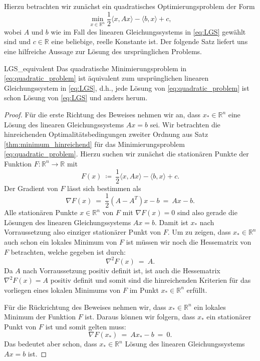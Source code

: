 Hierzu betrachten wir zunächst ein quadratisches Optimierungsproblem der Form
\begin{equation}
\label{eq:quadratic_problem}
\min_{x\in \mathbb{R}^n} \frac{1}{2} \langle x, Ax \rangle - \langle b, x \rangle + c,
\end{equation}
wobei $A$ und $b$ wie im Fall des linearen Gleichungssystems in \eqref{eq:LGS} gewählt sind und $c \in \mathbb{R}$ eine beliebige, reelle Konstante ist.
Der folgende Satz liefert uns eine hilfreiche Aussage zur Lösung des ursprünglichen Problems.
\begin{theorem}{}{LGS_equivalent}
Das quadratische Minimierungsproblem in \eqref{eq:quadratic_problem} ist äquivalent zum ursprünglichen linearen Gleichungssystem in \eqref{eq:LGS}, d.h., jede Lösung von \eqref{eq:quadratic_problem} ist schon Lösung von \eqref{eq:LGS} und anders herum.
\end{theorem}
%
%
\begin{proof}
Für die erste Richtung des Beweises nehmen wir an, dass $x_* \in \mathbb{R}^n$ eine Lösung des linearen Gleichungssystems $Ax = b$ sei. 
Wir betrachten die hinreichenden Optimalitätsbedingungen zweiter Ordnung aus Satz \ref{thm:minimum_hinreichend} für das Minimierungsproblem \eqref{eq:quadratic_problem}. 
Hierzu suchen wir zunächst die stationären Punkte der Funktion $F \colon \mathbb{R}^n \rightarrow \mathbb{R}$ mit
\begin{equation*}
F(x) \ \coloneqq \ \frac{1}{2} \langle x, Ax \rangle - \langle b, x \rangle + c.
\end{equation*}
Der Gradient von $F$ lässt sich bestimmen als
\begin{equation*}
\nabla F(x) \ = \ \frac{1}{2}(A - A^T)x - b \ = \ Ax - b.
\end{equation*}
Alle stationären Punkte $x \in \mathbb{R}^n$ von $F$ mit $\nabla F(x) = 0$ sind also gerade die Lösungen des linearen Gleichungssystems $Ax = b$.
Damit ist $x_*$ nach Vorraussetzung also einziger stationärer Punkt von $F$.
Um zu zeigen, dass $x_* \in \mathbb{R}^n$ auch schon ein lokales Minimum von $F$ ist müssen wir noch die Hessematrix von $F$ betrachten, welche gegeben ist durch:
\begin{equation*}
\nabla^2 F(x) \ = \ A.
\end{equation*}
Da $A$ nach Vorraussetzung positiv definit ist, ist auch die Hessematrix $\nabla^2 F(x) = A$ positiv definit und somit sind die hinreichenden Kriterien für das vorliegen eines lokalen Minimums von $F$ im Punkt $x_* \in \mathbb{R}^n$ erfüllt.

Für die Rückrichtung des Beweises nehmen wir, dass $x_* \in \mathbb{R}^n$ ein lokales Minimum der Funktion $F$ ist.
Daraus können wir folgern, dass $x_*$ ein stationärer Punkt von $F$ ist und somit gelten muss:
\begin{equation*}
\nabla F(x_*) \ = \ A x_* - b \ = \ 0.
\end{equation*}
Das bedeutet aber schon, dass $x_* \in \mathbb{R}^n$ Lösung des linearen Gleichungssystems $Ax = b$ ist.
\end{proof}
